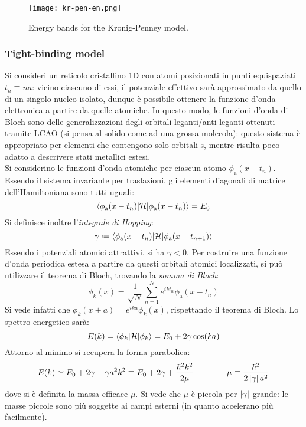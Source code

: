\begin{figure}
	\centering
	\texttt{[image: kr-pen-en.png]}
	\caption{Energy bands for the Kronig-Penney model.}
	\label{kr-pen-en}
\end{figure}

\subsubsection{Tight-binding model}

Si consideri un reticolo cristallino 1D con atomi posizionati in punti equispaziati $ t_n \equiv na $: vicino ciascuno di essi, il potenziale effettivo sarà approssimato da quello di un singolo nucleo isolato, dunque è possibile ottenere la funzione d'onda elettronica a partire da quelle atomiche. In questo modo, le funzioni d'onda di Bloch sono delle generalizzazioni degli orbitali leganti/anti-leganti ottenuti tramite LCAO (si pensa al solido come ad una grossa molecola): questo sistema è appropriato per elementi che contengono solo orbitali $ \text{s} $, mentre risulta poco adatto a descrivere stati metallici estesi. \\
Si considerino le funzioni d'onda atomiche per ciascun atomo $ \phi_\text{a}(x-t_n) $. Essendo il sistema invariante per traslazioni, gli elementi diagonali di matrice dell'Hamiltoniana sono tutti uguali:
\begin{equation}
	\braket{\phi_\text{a}(x-t_n) | \mathcal{H} | \phi_\text{a}(x-t_n)} = E_0
\end{equation}
Si definisce inoltre l'\textit{integrale di Hopping}:
\begin{equation}
	\gamma \defeq \braket{\phi_\text{a}(x-t_n) | \mathcal{H} | \phi_\text{a}(x-t_{n+1})}
\end{equation}
Essendo i potenziali atomici attrattivi, si ha $ \gamma < 0 $. Per costruire una funzione d'onda periodica estesa a partire da questi orbitali atomici localizzati, si può utilizzare il teorema di Bloch, trovando la \textit{somma di Bloch}:
\begin{equation}
	\phi_k(x) = \frac{1}{\sqrt{N}} \sum_{n = 1}^N e^{i k t_n} \phi_\text{a}(x-t_n)
\end{equation}
Si vede infatti che $ \phi_k(x+a) = e^{ika} \phi_k(x) $, rispettando il teorema di Bloch. Lo spettro energetico sarà:
\begin{equation}
	E(k) = \braket{\phi_k | \mathcal{H} | \phi_k} = E_0 + 2 \gamma \cos(ka)
\end{equation}
Attorno al minimo si recupera la forma parabolica:
\begin{equation}
	E(k) \simeq E_0 + 2\gamma - \gamma a^2 k^2 \equiv E_0 + 2\gamma + \frac{\hbar^2 k^2}{2\mu}
	\qquad \qquad
	\mu \equiv \frac{\hbar^2}{2 \left\lvert\gamma\right\rvert a^2}
\end{equation}
dove si è definita la massa efficace $ \mu $. Si vede che $ \mu $ è piccola per $ \left\lvert\gamma\right\rvert $ grande: le masse piccole sono più soggette ai campi esterni (in quanto accelerano più facilmente).

